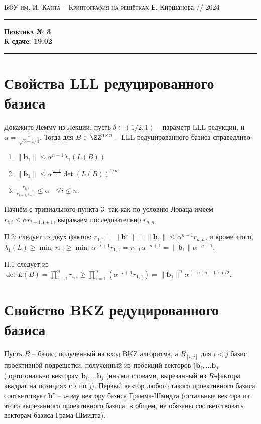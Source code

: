 \documentclass[11pt]{exam}
\theoremstyle{definition}
\renewcommand{\vec}{\mathbf}
\begin{document}
	{\noindent
		\textsc{БФУ им. И. Канта -- Криптография на решётках}
		\hfill {Е. Киршанова // 2024\\}
		\hrule
		\begin{center}
			{\Large\textbf{
					\textsc{Практика № 3}  \\[5pt]  К сдаче: 19.02
			} }
		\end{center}
		\hrule \vspace{5mm}
		
		\thispagestyle{empty}
		
		\vspace{0.2cm}
		\section{Свойства LLL редуцированного базиса}
		
		Докажите Лемму из Лекции: пусть $\delta \in (1/2, 1)$ -- параметр LLL редукции, и $\alpha = \frac{1}{\sqrt{\delta - 1/4}}$. Тогда для $B\in \ZZ^{n\times n}$ -- LLL редуцированного базиса справедливо:
		\begin{enumerate}
			\item  $\| \vec b_1 \| \leq \alpha^{n-1} \lambda_1(L(B))$
			\item  $\| \vec b_1 \| \leq \alpha^{\frac{n-1}{2}} \det(L(B))^{1/n}$
			\item $\frac{r_{i,i}}{r_{i+1, i+1}} \leq \alpha \quad \forall i \leq n$.
		\end{enumerate}
	
		\begin{solution}
			Начнём с тривиального пункта 3: так как по условию Ловаца имеем $r_{i,i} \leq \alpha r_{i+1, i+1}$, выражаем последовательно $r_{n,n}$.
			
			П.2: следует из двух фактов: $r_{1,1} = \| \vec b_{1}^\star \| = \| \vec b_{1} \| \leq \alpha^{n-1} r_{n,n}$, и кроме этого, $\lambda_1(L) \geq \min_i r_{i,i} \geq \min_i \alpha^{-i+1} r_{1,1} = r_{1,1} \alpha^{-n+1} = \| \vec b_{1} \| \alpha^{-n+1}$.
			
			П.1 следует из $\det L(B) = \prod_{i-1}^n r_{i,i} \geq \prod_{i=1}^n \left( \alpha^{-i+1} r_{1,1} \right) = \| \vec b_1 \|^n \alpha^{(-n(n-1))/2}$.
			\end{solution}

		\section{Свойство BKZ редуцированного базиса}
		
		Пусть $B$ -- базис, полученный на вход BKZ алгоритма, а $B_{[i,j]}$ для $i<j$ базис проективной подрешетки, полученный из проекций векторов ($\vec b_i, \ldots \vec b_j$),ортогонально векторам $\vec b_i, \ldots \vec b_j$ (иными словами, вырезанный из $R$-фактора квадрат на позициях с $i$ по $j$). Первый вектор любого такого проективного базиса соответствует $\vec b^{\star}$ -- $i$-ому вектору базиса Грамма-Шмидта (остальные вектора из этого вырезанного проективного базиса, в общем, не обязаны соответствовать векторам базиса Грама-Шмидта).
		\begin{questions}
		

\end{questions}}
\end{document}
